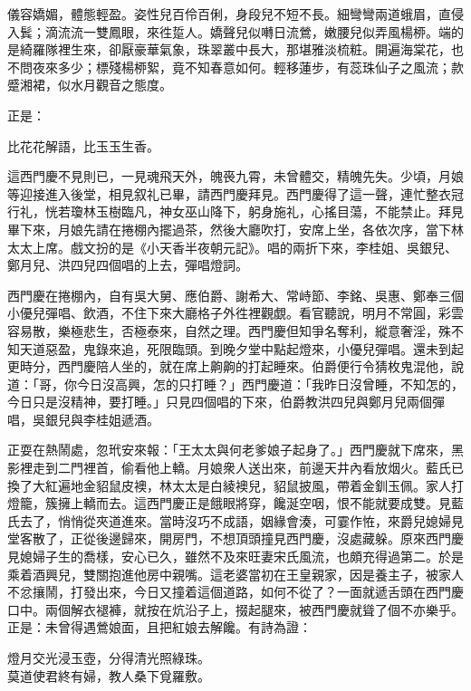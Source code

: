 \begin{myquote}
儀容嬌媚，體態輕盈。姿性兒百伶百俐，身段兒不短不長。細彎彎兩道蛾眉，直侵入鬂；滴流流一雙鳳眼，來徃踅人。嬌聲兒似囀日流鶯，嫩腰兒似弄風楊桺。端的是綺羅隊裡生來，卻厭豪華氣象，珠翠叢中長大，那堪雅淡梳粧。開遍海棠花，也不問夜來多少；標殘楊桺絮，竟不知春意如何。輕移蓮步，有蕊珠仙子之風流；款蹙湘裙，似水月觀音之態度。{}
\end{myquote}

正是：

\begin{myquote}
比花花解語，比玉玉生香。
\end{myquote}

這西門慶不見則已，一見魂飛天外，魄䘮九霄，未曾體交，精魄先失。少頃，月娘等迎接進入後堂，相見叙礼已畢，請西門慶拜見。西門慶得了這一聲，連忙整衣冠行礼，恍若瓊林玉樹臨凡，神女巫山降下，躬身施礼，心搖目蕩，不能禁止。{}拜見畢下來，月娘先請在捲棚內擺過茶，然後大廳吹打，安席上坐，各依次序，當下林太太上席。戲文扮的是《小天香半夜朝元記》。唱的兩折下來，李桂姐、吳銀兒、鄭月兒、洪四兒四個唱的上去，彈唱燈詞。

西門慶在捲棚內，自有吳大舅、應伯爵、謝希大、常峙節、李銘、吳惠、鄭奉三個小優兒彈唱、飲酒，不住下來大廳格子外徃裡觀覷。看官聽說，明月不常圓，彩雲容易散，樂極悲生，否極泰來，自然之理。西門慶但知爭名奪利，縱意奢淫，殊不知天道惡盈，鬼錄來追，死限臨頭。{}到晚夕堂中點起燈來，小優兒彈唱。還未到起更時分，西門慶陪人坐的，就在席上齁齁的打起睡來。伯爵便行令猜枚鬼混他，說道：「哥，你今日沒高興，怎的只打睡？」西門慶道：「我昨日沒曾睡，不知怎的，今日只是沒精神，要打睡。」只見四個唱的下來，伯爵教洪四兒與鄭月兒兩個彈唱，吳銀兒與李桂姐遞酒。

正耍在熱鬧處，忽玳安來報：「王太太與何老爹娘子起身了。」{}西門慶就下席來，黑影裡走到二門裡首，偷看他上轎。月娘衆人送出來，前邊天井內看放烟火。藍氏已換了大紅遍地金貂鼠皮襖，林太太是白綾襖兒，貂鼠披風，帶着金釧玉佩。家人打燈籠，簇擁上轎而去。這西門慶正是餓眼將穿，饞涎空咽，恨不能就要成雙。見藍氏去了，悄悄從夾道進來。當時沒巧不成語，姻緣會湊，可霎作恠，來爵兒媳婦見堂客散了，正從後邊歸來，開房門，不想頂頭撞見西門慶，沒處藏躲。原來西門慶見媳婦子生的喬樣，安心已久，雖然不及來旺妻宋氏風流，也頗充得過第二。於是乘着酒興兒，雙關抱進他房中親嘴。這老婆當初在王皇親家，因是養主子，被家人不忿攘鬧，打發出來，今日又撞着這個道路，如何不從了？{}一面就遞舌頭在西門慶口中。兩個解衣褪褲，就按在炕沿子上，掇起腿來，被西門慶就聳了個不亦樂乎。{}正是：未曾得遇鶯娘面，且把紅娘去解饞。有詩為證：

\begin{myquote}
燈月交光浸玉壺，分得清光照綠珠。\\莫道使君終有婦，教人桑下覓羅敷。
\end{myquote}
